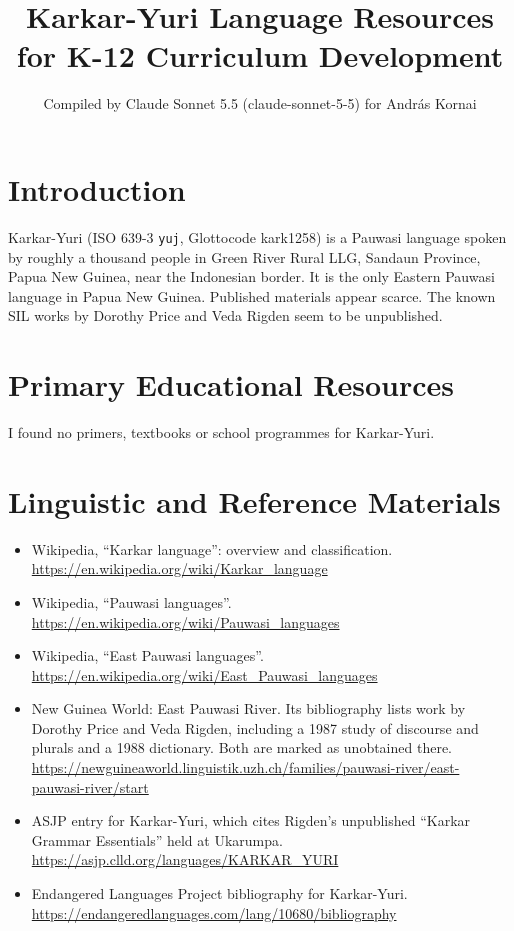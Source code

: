 \documentclass[12pt]{article}
\title{Karkar-Yuri Language Resources for K-12 Curriculum Development}
\author{Compiled by Claude Sonnet 5.5 (claude-sonnet-5-5) for Andr\'as Kornai}
\date{}
\begin{document}
\maketitle

\section{Introduction}
Karkar-Yuri (ISO 639-3 \texttt{yuj}, Glottocode kark1258) is a Pauwasi language spoken by roughly a thousand people in Green River Rural LLG, Sandaun Province, Papua New Guinea, near the Indonesian border. It is the only Eastern Pauwasi language in Papua New Guinea. Published materials appear scarce. The known SIL works by Dorothy Price and Veda Rigden seem to be unpublished.

\section{Primary Educational Resources}
I found no primers, textbooks or school programmes for Karkar-Yuri.

\section{Linguistic and Reference Materials}
\begin{itemize}
\item Wikipedia, ``Karkar language'': overview and classification. \url{https://en.wikipedia.org/wiki/Karkar_language}
\item Wikipedia, ``Pauwasi languages''. \url{https://en.wikipedia.org/wiki/Pauwasi_languages}
\item Wikipedia, ``East Pauwasi languages''. \url{https://en.wikipedia.org/wiki/East_Pauwasi_languages}
\item New Guinea World: East Pauwasi River. Its bibliography lists work by Dorothy Price and Veda Rigden, including a 1987 study of discourse and plurals and a 1988 dictionary. Both are marked as unobtained there. \url{https://newguineaworld.linguistik.uzh.ch/families/pauwasi-river/east-pauwasi-river/start}
\item ASJP entry for Karkar-Yuri, which cites Rigden's unpublished ``Karkar Grammar Essentials'' held at Ukarumpa. \url{https://asjp.clld.org/languages/KARKAR_YURI}
\item Endangered Languages Project bibliography for Karkar-Yuri. \url{https://endangeredlanguages.com/lang/10680/bibliography}
\end{itemize}
\end{document}
